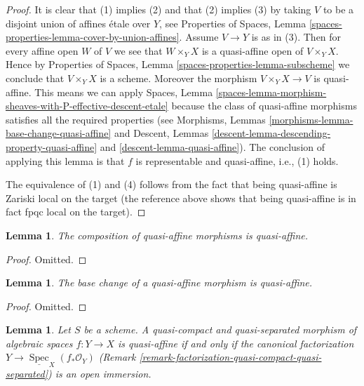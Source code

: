 \documentclass{stacks-project}
\theoremstyle{plain}
\newtheorem{lemma}[subsection]{Lemma}
\theoremstyle{definition}
\theoremstyle{remark}
\numberwithin{equation}{subsection}
\def\Spec{\mathop{\mathrm{Spec}}}
\begin{document}
\begin{proof}
It is clear that (1) implies (2) and that (2) implies (3) by taking
$V$ to be a disjoint union of affines \'etale over $Y$, see
Properties of Spaces,
Lemma \ref{spaces-properties-lemma-cover-by-union-affines}.
Assume $V \to Y$ is as in (3). Then for every affine open $W$ of $V$ we see
that $W \times_Y X$ is a quasi-affine open of $V \times_Y X$. Hence by
Properties of Spaces, Lemma \ref{spaces-properties-lemma-subscheme}
we conclude that $V \times_Y X$ is a scheme. Moreover the morphism
$V \times_Y X \to V$ is quasi-affine. This means we can apply
Spaces,
Lemma \ref{spaces-lemma-morphism-sheaves-with-P-effective-descent-etale}
because the class of quasi-affine morphisms satisfies all the required
properties (see
Morphisms, Lemmas \ref{morphisms-lemma-base-change-quasi-affine} and
Descent, Lemmas \ref{descent-lemma-descending-property-quasi-affine}
and \ref{descent-lemma-quasi-affine}). The conclusion of applying this lemma
is that $f$ is representable and quasi-affine, i.e., (1) holds.

\medskip\noindent
The equivalence of (1) and (4) follows from the fact that being
quasi-affine is Zariski local on the target (the reference above shows
that being quasi-affine is in fact fpqc local on the target).
\end{proof}

\begin{lemma}
\label{lemma-composition-quasi-affine}
The composition of quasi-affine morphisms is quasi-affine.
\end{lemma}

\begin{proof}
Omitted.
\end{proof}

\begin{lemma}
\label{lemma-base-change-quasi-affine}
The base change of a quasi-affine morphism is quasi-affine.
\end{lemma}

\begin{proof}
Omitted.
\end{proof}

\begin{lemma}
\label{lemma-characterize-quasi-affine}
Let $S$ be a scheme.
A quasi-compact and quasi-separated morphism of algebraic spaces
$f : Y \to X$ is quasi-affine if and only if the canonical factorization
$Y \to \underline{\Spec}_X(f_*\mathcal{O}_Y)$
(Remark \ref{remark-factorization-quasi-compact-quasi-separated})
is an open immersion.
\end{lemma}
\end{document}

